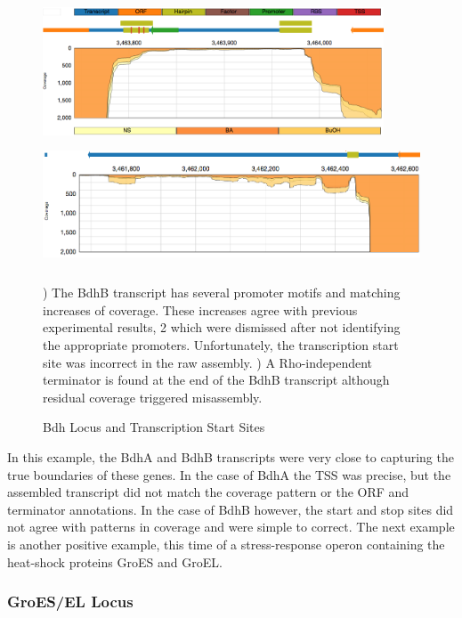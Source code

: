 \begin{figure}
\small
{\includegraphics[width=\textwidth,height=1.5in]{images/Assembly/Examples/Bdh/BdhB-TSS.png}
\label{fig:6a}}
{\includegraphics[width=\textwidth,height=1.5in]{images/Assembly/Examples/Bdh/BdhB-termination.png}
\label{fig:6b}}
\caption{Bdh Locus and Transcription Start Sites}
) The BdhB transcript has several promoter motifs and matching increases of coverage. These increases agree with previous experimental results\cite{73}, 2 which were dismissed after not identifying the appropriate promoters. Unfortunately, the transcription start site was incorrect in the raw assembly. ) A Rho-independent terminator is found at the end of the BdhB transcript although residual coverage triggered misassembly.
\end{figure}

In this example, the BdhA and BdhB transcripts were very close to capturing the true boundaries of these genes. In the case of BdhA the TSS was precise, but the assembled transcript did not match the coverage pattern or the ORF and terminator annotations. In the case of BdhB however, the start and stop sites did not agree with patterns in coverage and were simple to correct. The next example is another positive example, this time of a stress-response operon containing the heat-shock proteins GroES and GroEL.

\subsubsection{GroES/EL Locus}
